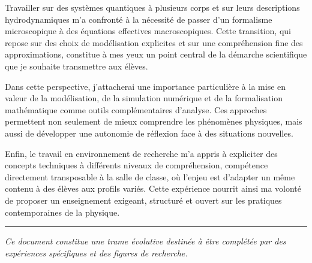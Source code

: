 Travailler sur des systèmes quantiques à plusieurs corps et sur leurs
descriptions hydrodynamiques m’a confronté à la nécessité de passer d’un
formalisme microscopique à des équations effectives macroscopiques. Cette
transition, qui repose sur des choix de modélisation explicites et sur une
compréhension fine des approximations, constitue à mes yeux un point central de
la démarche scientifique que je souhaite transmettre aux élèves.

Dans cette perspective, j’attacherai une importance particulière à la mise en
valeur de la modélisation, de la simulation numérique et de la formalisation
mathématique comme outils complémentaires d’analyse. Ces approches permettent
non seulement de mieux comprendre les phénomènes physiques, mais aussi de
développer une autonomie de réflexion face à des situations nouvelles.

Enfin, le travail en environnement de recherche m’a appris à expliciter des
concepts techniques à différents niveaux de compréhension, compétence
directement transposable à la salle de classe, où l’enjeu est d’adapter un même
contenu à des élèves aux profils variés. Cette expérience nourrit ainsi ma
volonté de proposer un enseignement exigeant, structuré et ouvert sur les
pratiques contemporaines de la physique.

\vfill
\hrule
\begin{center}
    \small{\textit{Ce document constitue une trame évolutive destinée à être complétée par des expériences spécifiques et des figures de recherche.}}
\end{center}








